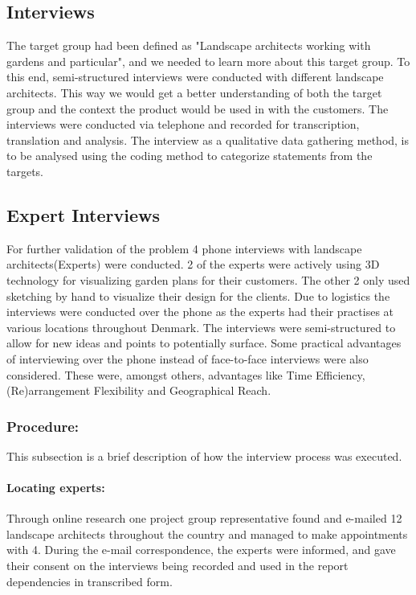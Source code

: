 	\subsection{Interviews}
	
	The target group had been defined as "Landscape architects working with gardens and particular", and we needed to learn more about this target group. To this end, semi-structured interviews were conducted with different landscape architects. This way we would get a better understanding of both the target group and the context the product would be used in with the customers. The interviews were conducted via telephone and recorded for transcription, translation and analysis. The interview as a qualitative data gathering method, is to be analysed using the coding method to categorize statements from the targets.
	
	\subsection{Expert Interviews}\label{sec:expertInterviews}
		For further validation of the problem 4 phone interviews with landscape architects(Experts) were conducted. 2 of the experts were actively using 3D technology for visualizing garden plans for their customers. The other 2 only used sketching by hand to visualize their design for the clients. Due to logistics the interviews were conducted over the phone as the experts had their practises at various locations throughout Denmark. The interviews were semi-structured to allow for new ideas and points to potentially surface. Some practical advantages of interviewing over the phone instead of face-to-face interviews were also considered. These were, amongst others, advantages like Time Efficiency, (Re)arrangement Flexibility and Geographical Reach\cite{telephoneInterview}. 
		
		\subsubsection{Procedure:}
		This subsection is a brief description of how the interview process was executed.
		
		\paragraph*{Locating experts:}Through online research one project group representative found and e-mailed 12 landscape architects throughout the country and managed to make appointments with 4. During the e-mail correspondence, the experts were informed, and gave their consent on the interviews being recorded and used in the report dependencies in transcribed form.
		
